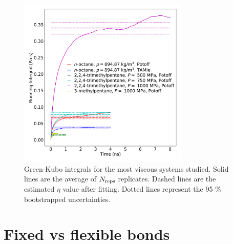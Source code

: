 \documentclass[preprint,review,11pt]{elsarticle}
\begin{document}
    \begin{figure}[htb!]
    	\centering
    	\includegraphics[width=3.2in]{most_viscous_systems.pdf}
    	\caption{Green-Kubo integrals for the most viscous systems studied. Solid lines are the average of $N_{\rm reps}$ replicates. Dashed lines are the estimated $\eta$ value after fitting. Dotted lines represent the 95 \% bootstrapped uncertainties.}
    	\label{fig:most_viscous}
    \end{figure} 
    
    
    
%    
%    
	

	\newpage
	
	\section{Fixed vs flexible bonds} \label{fixed flexible}
	
\end{document}
